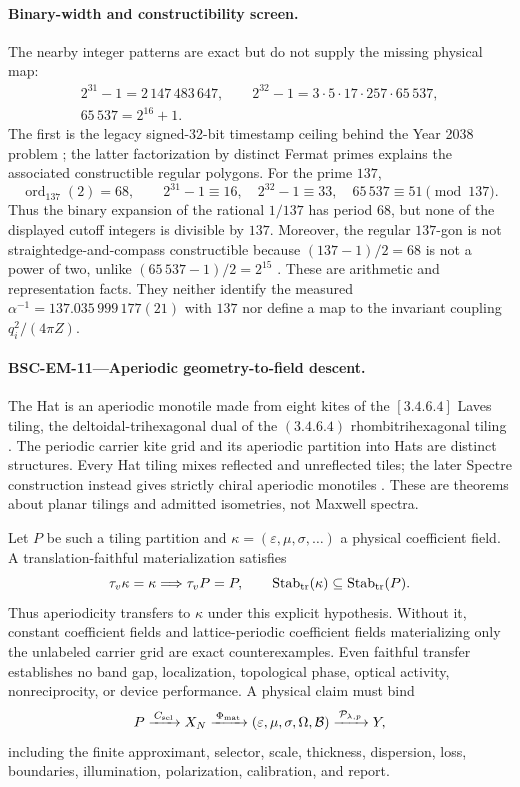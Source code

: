 \documentclass[11pt,a4paper]{article}
\theoremstyle{definition}
\theoremstyle{plain}
\theoremstyle{remark}
\begin{document}
\paragraph{Binary-width and constructibility screen.}
The nearby integer patterns are exact but do not supply the missing physical
map:
\[
\begin{gathered}
2^{31}-1=2\,147\,483\,647,\qquad
2^{32}-1=3\cdot5\cdot17\cdot257\cdot65\,537,\\
65\,537=2^{16}+1.
\end{gathered}
\]
The first is the legacy signed-32-bit timestamp ceiling behind the Year 2038
problem \citep{opengroup2024epoch}; the latter factorization by distinct Fermat
primes explains the associated constructible regular polygons.  For the prime
\(137\),
\[
\operatorname{ord}_{137}(2)=68,\qquad
2^{31}-1\equiv16,\quad
2^{32}-1\equiv33,\quad
65\,537\equiv51\pmod{137}.
\]
Thus the binary expansion of the rational \(1/137\) has period \(68\), but
none of the displayed cutoff integers is divisible by \(137\).  Moreover, the
regular \(137\)-gon is not straightedge-and-compass constructible because
\((137-1)/2=68\) is not a power of two, unlike
\((65\,537-1)/2=2^{15}\) \citep{wantzel1837}.  These are arithmetic and
representation facts.  They neither identify the measured
\(\alpha^{-1}=137.035\,999\,177(21)\) with \(137\) nor define a map to the
invariant coupling \(q_i^2/(4\pi Z)\).

\paragraph{\textbf{BSC-EM-11}---Aperiodic geometry-to-field descent.}
The Hat is an aperiodic monotile made from eight kites of the
\([3.4.6.4]\) Laves tiling, the deltoidal-trihexagonal dual of the
\((3.4.6.4)\) rhombitrihexagonal tiling
\citep{smith2024hat}.  The periodic carrier kite grid and its aperiodic
partition into Hats are distinct structures.  Every Hat tiling mixes
reflected and unreflected tiles; the later Spectre construction instead gives
strictly chiral aperiodic monotiles \citep{smith2024spectre}.  These are
theorems about planar tilings and admitted isometries, not Maxwell spectra.

Let \(P\) be such a tiling partition and
\(\kappa=(\varepsilon,\mu,\sigma,\ldots)\) a physical coefficient field.  A
translation-faithful materialization satisfies
\[
\tau_v\kappa=\kappa\Longrightarrow\tau_vP=P,
\qquad
\operatorname{Stab}_{\rm tr}(\kappa)
\subseteq\operatorname{Stab}_{\rm tr}(P).
\]
Thus aperiodicity transfers to \(\kappa\) under this explicit hypothesis.
Without it, constant coefficient fields and lattice-periodic coefficient
fields materializing only the unlabeled carrier grid are exact
counterexamples.  Even faithful transfer
establishes no band gap, localization, topological phase, optical activity,
nonreciprocity, or device performance.  A physical claim must bind
\[
P\xrightarrow{\,C_{\rm sel}\,}X_N
\xrightarrow{\,\Phi_{\rm mat}\,}
(\varepsilon,\mu,\sigma,\Omega,\mathcal B)
\xrightarrow{\,\mathcal P_{\lambda,p}\,}Y,
\]
including the finite approximant, selector, scale, thickness, dispersion,
loss, boundaries, illumination, polarization, calibration, and report.
\end{document}
